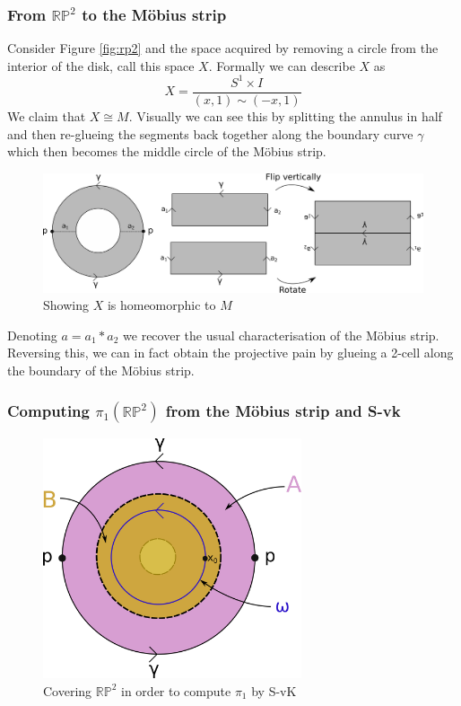 \documentclass[11pt]{article}
\newcommand{\RP}{\mathbb{R}\mathbb{P}}
\begin{document}
\subsubsection{From $\RP^2$ to the M\"obius strip}
Consider Figure \ref{fig:rp2} and the space acquired by removing a circle from the interior of the disk, call this space $X$.
Formally we can describe $X$ as
\[
	X = \frac{S^1 \times I}{(x,1) \sim (-x,1)}
\]
We claim that $X\cong M$.
Visually we can see this by splitting the annulus in half and then re-glueing the segments back together along the boundary curve $\gamma$ which then becomes the middle circle of the M\"obius strip.

\begin{figure}[ht]
	\centering
	\includegraphics[width=5in]{rp2toM.png}
	\caption{Showing $X$ is homeomorphic to $M$}
	\label{fig:rp2toM}
\end{figure}

Denoting $a=a_1\ast a_2$ we recover the usual characterisation of the M\"obius strip.
Reversing this, we can in fact obtain the projective pain by glueing a 2-cell along the boundary of the M\"obius strip.

\subsubsection{Computing $\pi_1(\RP^2)$ from the M\"obius strip and S-vk}

\begin{figure}[ht]
	\centering
	\includegraphics[width=3in]{rp2svk.png}
	\caption{Covering $\RP^2$ in order to compute $\pi_1$ by S-vK}
	\label{fig:rp2svk}
\end{figure}
\end{document}
